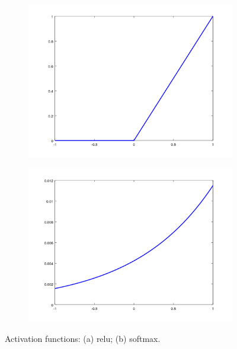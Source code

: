\begin{description}
	\begin{figure}
		\centering
		\begin{subfigure}{0.5\textwidth}
			\centering
			\includegraphics[width=1\linewidth]{figures/relu.png}
			\caption{}
		\end{subfigure}%
		\begin{subfigure}{0.5\textwidth}
			\centering
			\includegraphics[width=1\linewidth]{figures/softmax.png}
			\caption{}
		\end{subfigure}
		\caption{Activation functions: (a) \gls{relu}; (b) softmax.}
		\label{fig:activations}
	\end{figure}
	
\end{description}

